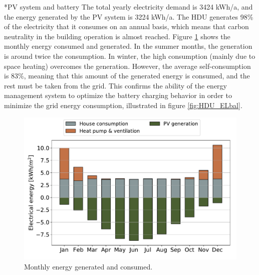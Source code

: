 \documentclass[twocolumn, a4paper,10pt]{article}
\makeatletter
\renewcommand\subsection{\@startsection{subsection}{1}{\z@}{\z@}{\z@}{\normalfont\normalsize\bfseries}}
\renewcommand\subsection{\@startsection{subsection}{1}{\z@}{\z@}{0.1pt}{\normalfont\normalsize\bfseries}}
\makeatother
\begin{document}
\subsection*{PV system and battery}
The total yearly electricity demand is 3424 kWh/a, and the energy generated by the PV system is 3224 kWh/a. The HDU generates 98\% of the electricity that it consumes on an annual basis, which means that carbon neutrality in the building operation is almost reached. Figure \ref{fig:HDU_PVbal} shows the monthly energy consumed and generated. In the summer months, the generation is around twice the consumption. In winter, the high consumption (mainly due to space heating) overcomes the generation. However, the average self-consumption is 83\%, meaning that this amount of the generated energy is consumed, and the rest must be taken from the grid. This confirms the ability of the energy management system to optimize the battery charging behavior in order to minimize the grid energy consumption, illustrated in figure \ref{fig:HDU_ELbal}.\\ 

\begin{figure}[H]
\vspace{-2pt} 
\centering
\includegraphics[scale=0.34]{img/HDU_PVbal.pdf}
\caption{Monthly energy generated and consumed.}
\label{fig:HDU_PVbal}
\end{figure}
\end{document}
